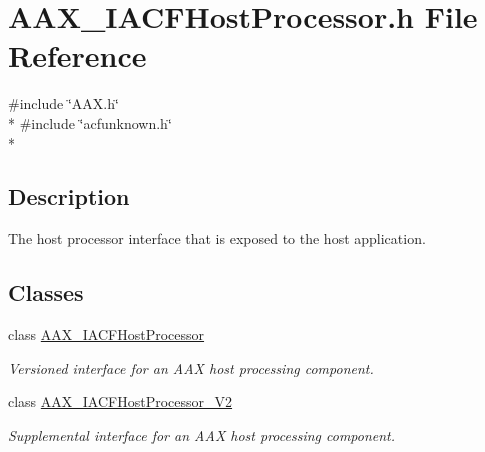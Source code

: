 \hypertarget{a00226}{}\section{A\+A\+X\+\_\+\+I\+A\+C\+F\+Host\+Processor.\+h File Reference}
\label{a00226}
{\ttfamily \#include \char`\"{}A\+A\+X.\+h\char`\"{}}\\*
{\ttfamily \#include \char`\"{}acfunknown.\+h\char`\"{}}\\*


\subsection{Description}
The host processor interface that is exposed to the host application. 

\subsection*{Classes}
\begin{DoxyCompactItemize}
\item 
class \hyperlink{a00066}{A\+A\+X\+\_\+\+I\+A\+C\+F\+Host\+Processor}
\begin{DoxyCompactList}\small\item\em Versioned interface for an A\+A\+X host processing component. \end{DoxyCompactList}\item 
class \hyperlink{a00067}{A\+A\+X\+\_\+\+I\+A\+C\+F\+Host\+Processor\+\_\+\+V2}
\begin{DoxyCompactList}\small\item\em Supplemental interface for an A\+A\+X host processing component. \end{DoxyCompactList}\end{DoxyCompactItemize}
